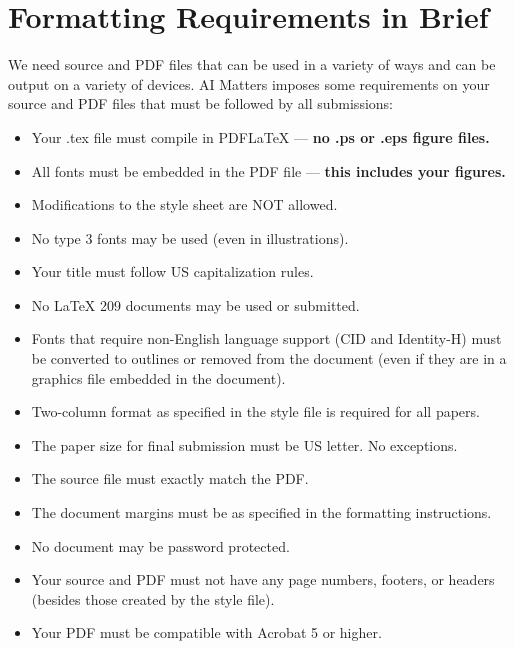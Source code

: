 \documentclass[letterpaper]{article}
\begin{document}
\section{Formatting Requirements in Brief}
We need source and PDF files that can be used in a variety of ways and can be output on a variety of devices. AI Matters imposes some requirements on your source and PDF files that must be followed by all submissions:
\begin{itemize}
\item Your .tex file must compile in PDF\LaTeX{} --- \textbf{ no .ps or .eps figure files.}
\item All fonts must be embedded in the PDF file --- \textbf{ this includes your figures.}
\item Modifications to the style sheet are NOT allowed.
\item No type 3 fonts may be used (even in illustrations).
\item Your title must follow US capitalization rules.
\item No \LaTeX{} 209 documents may be used or submitted.
\item Fonts that require non-English language support (CID and Identity-H) must be converted to outlines or removed from the document (even if they are in a graphics file embedded in the document). 
\item Two-column format as specified in the style file is required for all papers.
\item The paper size for final submission must be US letter. No exceptions.
\item The source file must exactly match the PDF.
\item The document margins must be as specified in the formatting instructions.
\item No document may be password protected.
\item Your source and PDF must not have any page numbers, footers, or headers (besides those created by the style file).
\item Your PDF must be compatible with Acrobat 5 or higher.
\end{itemize}
\end{document}
